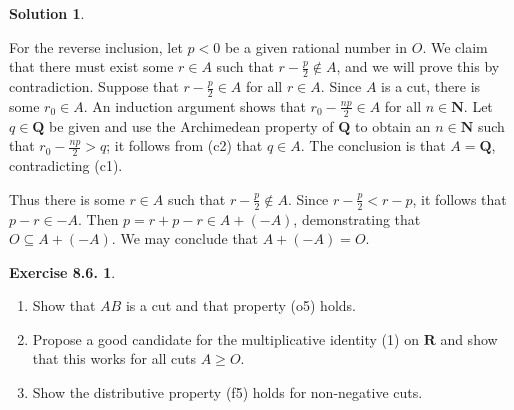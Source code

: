 \documentclass[12pt]{article}
\theoremstyle{definition}
\theoremstyle{exercise}
\newtheorem{exercise}{Exercise 8.6.}
\theoremstyle{solution}
\newtheorem*{solution}{Solution}
\newcommand{\N}{\mathbf{N}}
\newcommand{\Q}{\mathbf{Q}}
\newcommand{\R}{\mathbf{R}}
\begin{document}
\begin{solution}
\begin{enumerate}
        For the reverse inclusion, let \( p < 0 \) be a given rational number in \( O \). We claim that there must exist some \( r \in A \) such that \( r - \tfrac{p}{2} \not\in A \), and we will prove this by contradiction. Suppose that \( r - \tfrac{p}{2} \in A \) for all \( r \in A \). Since \( A \) is a cut, there is some \( r_0 \in A \). An induction argument shows that \( r_0 - \tfrac{np}{2} \in A \) for all \( n \in \N \). Let \( q \in \Q \) be given and use the Archimedean property of \( \Q \) to obtain an \( n \in \N \) such that \( r_0 - \tfrac{np}{2} > q \); it follows from (c2) that \( q \in A \). The conclusion is that \( A = \Q \), contradicting (c1).

        Thus there is some \( r \in A \) such that \( r - \tfrac{p}{2} \not\in A \). Since \( r - \tfrac{p}{2} < r - p \), it follows that \( p - r \in -A \). Then \( p = r + p - r \in A + (-A) \), demonstrating that \( O \subseteq A + (-A) \). We may conclude that \( A + (-A) = O \).
    \end{enumerate}
\end{solution}

\begin{exercise}
\label{ex:7}
    \begin{enumerate}
        \item Show that \( AB \) is a cut and that property (o5) holds.

        \item Propose a good candidate for the multiplicative identity (1) on \( \R \) and show that this works for all cuts \( A \geq O \).

        \item Show the distributive property (f5) holds for non-negative cuts.
    \end{enumerate}
\end{exercise}
\end{document}
